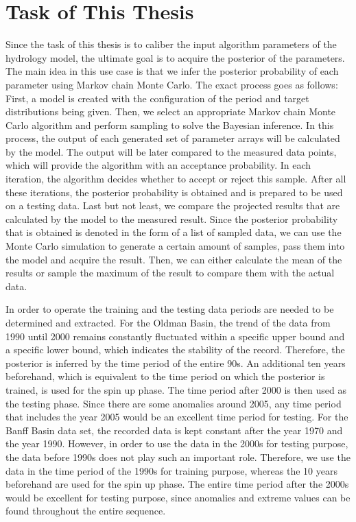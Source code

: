 \section{Task of This Thesis}
Since the task of this thesis is to caliber the input algorithm parameters of the hydrology model, the ultimate goal is to acquire the posterior of the parameters. The main idea in this use case is that we infer the posterior probability of each parameter using Markov chain Monte Carlo. The exact process goes as follows: First, a model is created with the configuration of the period and target distributions being given. Then, we select an appropriate Markov chain Monte Carlo algorithm and perform sampling to solve the Bayesian inference. In this process, the output of each generated set of parameter arrays will be calculated by the model. The output will be later compared to the measured data points, which will provide the algorithm with an acceptance probability. In each iteration, the algorithm decides whether to accept or reject this sample. After all these iterations, the posterior probability is obtained and is prepared to be used on a testing data. Last but not least, we compare the projected results that are calculated by the model to the measured result. Since the posterior probability that is obtained is denoted in the form of a list of sampled data, we can use the Monte Carlo simulation to generate a certain amount of samples, pass them into the model and acquire the result. Then, we can either calculate the mean of the results or sample the maximum of the result to compare them with the actual data.

In order to operate the training and the testing data periods are needed to be determined and extracted. For the Oldman Basin, the trend of the data from 1990 until 2000 remains constantly fluctuated within a specific upper bound and a specific lower bound, which indicates the stability of the record. Therefore, the posterior is inferred by the time period of the entire 90s. An additional ten years beforehand, which is equivalent to the time period on which the posterior is trained, is used for the spin up phase. The time period after 2000 is then used as the testing phase. Since there are some anomalies around 2005, any time period that includes the year 2005 would be an excellent time period for testing. For the Banff Basin data set, the recorded data is kept constant after the year 1970 and the year 1990. However, in order to use the data in the 2000s for testing purpose, the data before 1990s does not play such an important role. Therefore, we use the data in the time period of the 1990s for training purpose, whereas the 10 years beforehand are used for the spin up phase. The entire time period after the 2000s would be excellent for testing purpose, since anomalies and extreme values can be found throughout the entire sequence.

